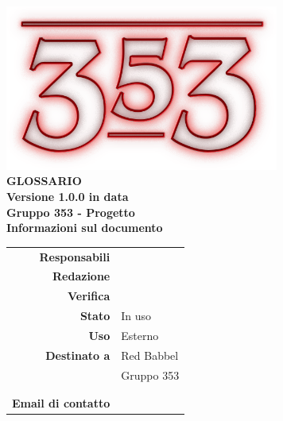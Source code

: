 \documentclass[openany, a4paper, 12pt]{report}
\begin{document}
\begin{titlepage}
\centering
\vfill
{
	\bfseries
	\vskip2cm
	\includegraphics[width=9cm]{../../common/images/logo.png} \\
	\vfill
	\Huge{GLOSSARIO}\\
	\vfill
	\Large Versione 1.0.0 in data \\
	\large Gruppo 353 - Progetto \progetto \\
	\vfill
	\normalsize Informazioni sul documento\\
	\begin{table}[htbp]
		\centering
		\renewcommand\arraystretch{1.2}
		\begin{tabular}{r|l}
			\hline
			\textbf{Responsabili}	& \Elena\\
			
			\textbf{Redazione} 		& \Valentina \\
			\textbf{Verifica} 		& \Davide \\	
			
			\textbf{Stato} 			& In uso\\
			\textbf{Uso}			& Esterno\\
			\textbf{Destinato a}   	& Red Babbel\\
									& Gruppo 353\\
									& \Vardanega\\
									& \Cardin\\
			
			\textbf{Email di contatto}	& \mailgroup
		\end{tabular}
	\end{table}
	\vfill 
}      
\end{titlepage}

\printglossary
 
\end{document}
